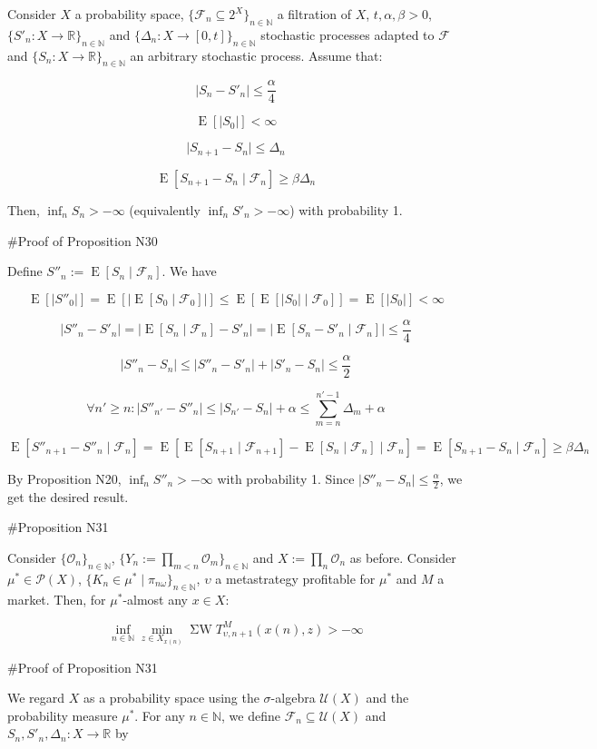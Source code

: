 \documentclass[a4paper]{article}
\DeclareMathOperator{\E}{E}
\newcommand{\Nats}{\mathbb{N}}
\newcommand{\Reals}{\mathbb{R}}
\newcommand{\Sq}[2]{\{#1\}_{#2 \in \Nats}}
\newcommand{\Sqn}[1]{\Sq{#1}{n}}
\newcommand{\Abs}[1]{\lvert #1 \rvert}
\newcommand{\Prob}{\mathcal{P}}
\newcommand{\Ob}{\mathcal{O}}
\newcommand{\UM}{\mathcal{U}}
\newcommand{\SW}{\operatorname{\Sigma W}}
\newcommand{\F}{\mathcal{F}}
\begin{document}
Consider ${X}$ a probability space, ${\{\F_n \subseteq 2^X\}_{n \in \Nats}}$ a filtration of ${X}$, ${t,\alpha,\beta > 0}$, ${\{S'_n:X \rightarrow \Reals\}_{n \in \Nats}}$ and ${\{\Delta_n:X \rightarrow [0,t]\}_{n \in \Nats}}$ stochastic processes adapted to ${\F}$ and ${\Sqn{S_n:X \rightarrow \Reals}}$ an arbitrary stochastic process. Assume that:

$$\Abs{S_n - S'_n} \leq \frac{\alpha}{4}$$

$$\E[\Abs{S_0}] < \infty$$

$$\Abs{S_{n+1}-S_n} \leq \Delta_n$$

$$\E[S_{n+1} - S_n \mid \F_n] \geq \beta \Delta_n$$

Then, ${\inf_{n} S_n > -\infty}$ (equivalently ${\inf_{n} S'_n > -\infty}$) with probability 1.

\#Proof of Proposition N30

Define ${S''_n:= \E[S_n \mid \F_n]}$. We have

$$\E[\Abs{S''_0}] = \E[\Abs{\E[S_0 \mid \F_0]}] \leq \E[\E[\Abs{S_0} \mid \F_0]] = \E[\Abs{S_0}] < \infty$$

$$\Abs{S''_n - S'_n} = \Abs{\E[S_n \mid \F_n] - S'_n} = \Abs{\E[S_n - S'_n \mid \F_n]} \leq \frac{\alpha}{4}$$

$$\Abs{S''_n - S_n} \leq \Abs{S''_n - S'_n} + \Abs{S'_n - S_n} \leq \frac{\alpha}{2}$$

$$\forall n' \geq n: \Abs{S''_{n'}-S''_n} \leq \Abs{S_{n'}-S_n} + \alpha \leq \sum_{m=n}^{n'-1} \Delta_m + \alpha$$

$$\E[S''_{n+1}-S''_n \mid \F_n] = \E[\E[S_{n+1} \mid \F_{n+1}]-\E[S_n \mid \F_n] \mid \F_n] = \E[S_{n+1}-S_n \mid \F_n] \geq \beta \Delta_n$$

By Proposition N20, ${\inf_n S''_n > -\infty}$ with probability 1. Since ${\Abs{S''_n - S_n} \leq \frac{\alpha}{2}}$, we get the desired result.

\#Proposition N31

Consider ${\Sqn{\Ob_n}}$, ${\Sqn{Y_n:=\prod_{m < n} \Ob_m}}$ and ${X:=\prod_n \Ob_n}$ as before. Consider ${\mu^* \in \Prob(X)}$, ${\{K_n \in \mu^* \mid \pi_{n\omega}\}_{n \in \Nats}}$, ${\upsilon}$ a metastrategy profitable for ${\mu^*}$ and ${M}$ a market. Then, for ${\mu^*}$-almost any ${x \in X}$:

$$\inf_{n \in \Nats} \min_{z \in X_{x(n)}} \SW T^M_{\upsilon, n+1}(x(n),z) > -\infty$$

\#Proof of Proposition N31

We regard ${X}$ as a probability space using the ${\sigma}$-algebra ${\UM(X)}$ and the probability measure ${\mu^*}$. For any ${n \in \Nats}$, we define ${\F_n \subseteq \UM(X)}$ and ${S_n,S'_n,\Delta_n: X \rightarrow \Reals}$ by 
\end{document}
